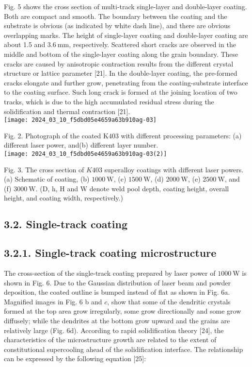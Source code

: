\documentclass[10pt]{article}
\begin{document}
Fig. 5 shows the cross section of multi-track single-layer and double-layer coating. Both are compact and smooth. The boundary between the coating and the substrate is obvious (as indicated by white dash line), and there are obvious overlapping marks. The height of single-layer coating and double-layer coating are about 1.5 and $3.6 \mathrm{~mm}$, respectively. Scattered short cracks are observed in the middle and bottom of the single-layer coating along the grain boundary. These cracks are caused by anisotropic contraction results from the different crystal structure or lattice parameter [21]. In the double-layer coating, the pre-formed cracks elongate and further grow, penetrating from the coating-substrate interface to the coating surface. Such long crack is formed at the joining location of two tracks, which is due to the high accumulated residual stress during the solidification and thermal contraction [21].\\
\texttt{[image: 2024\_03\_10\_f5dbd05e4659a63b910ag-03]}

Fig. 2. Photograph of the coated $\mathrm{K} 403$ with different processing parameters: (a) different laser power, and(b) different layer number.\\
\texttt{[image: 2024\_03\_10\_f5dbd05e4659a63b910ag-03(2)]}

Fig. 3. The cross section of $K 403$ superalloy coatings with different laser powers. (a) Schematic of coating, (b) $1000 \mathrm{~W}$, (c) $1500 \mathrm{~W}$, (d) $2000 \mathrm{~W}$, (e) $2500 \mathrm{~W}$, and (f) $3000 \mathrm{~W}$. (D, h, H and W denote weld pool depth, coating height, overall height, and coating width, respectively.)

\subsection*{3.2. Single-track coating}
\subsection*{3.2.1. Single-track coating microstructure}
The cross-section of the single-track coating prepared by laser power of $1000 \mathrm{~W}$ is shown in Fig. 6. Due to the Gaussian distribution of laser beam and powder deposition, the coated outline is bumped instead of flat as shown in Fig. 6a. Magnified images in Fig. 6 b and $c$, show that some of the dendritic crystals formed at the top area grow irregularly, some grow directionally and some grow diffusely; while the dendrites at the bottom grow upward and the grains are relatively large (Fig. 6d). According to rapid solidification theory [24], the characteristics of the microstructure growth are related to the extent of constitutional supercooling ahead of the solidification interface. The relationship can be expressed by the following equation [25]:
\end{document}
